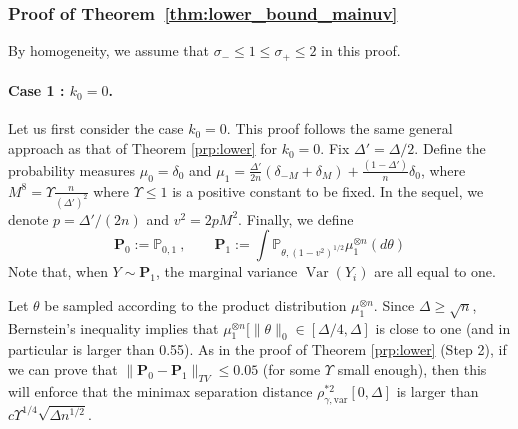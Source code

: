 \documentclass[twoside,11pt]{article}
\newcommand{\var}[1]{\operatorname{Var}\left(#1\right)}
\newcommand{\<}{\langle}
\renewcommand{\>}{\rangle}
\begin{document}
\subsubsection{Proof of Theorem~\ref{thm:lower_bound_mainuv}}

By homogeneity, we assume that $\sigma_-\leq 1\leq \sigma_+\leq 2$ in this proof. 


\paragraph{Case 1 : $k_0 = 0$.} Let us first consider the case $k_0 = 0$.
This proof follows the same general approach as that of Theorem \ref{prp:lower} for $k_0=0$. Fix $\Delta'= \Delta/2$. 
Define the probability measures $\mu_0=\delta_0$ and $\mu_1 = \frac{\Delta'}{2n}(\delta_{-M} + \delta_{M}) + \frac{(1-\Delta')}{n}\delta_0$, where $M^8 = \Upsilon \frac{n}{(\Delta')^2}$ where $\Upsilon\leq 1$ is a positive constant to be fixed.  In the sequel, we denote  $p = \Delta'/(2n)$ and  $v^2 = 2p M^2$. Finally, we define 
\[
 \mathbf{P}_0:= \mathbb{P}_{0,1} \ ,\quad \quad  \mathbf{P}_1:= \int \mathbb{P}_{\theta,(1-v^2)^{1/2}} \mu_1^{\otimes n}(d\theta)
\]
Note that, when $Y\sim \mathbf{P}_1$, the marginal variance $\var{Y_i}$ are all equal to one. 


Let $\theta$ be sampled according to the product distribution $\mu_1^{\otimes n}$. Since $\Delta\geq \sqrt{n}$, Bernstein's inequality implies that $\mu_1^{\otimes n}[\|\theta\|_0\in [\Delta/4,\Delta]$ is close to one (and in particular is larger than 0.55). As in the proof of Theorem \ref{prp:lower} (Step 2), if we can prove that $\|\mathbf{P}_0-\mathbf{P}_1\|_{TV}\leq 0.05$ (for some $\Upsilon$ small enough), then this will enforce that the minimax separation distance $\rho^{*2}_{\gamma,\mathrm{var}}[0,\Delta]$ is larger than $c \Upsilon^{1/4}\sqrt{\Delta n^{1/2}}$.
\end{document}
